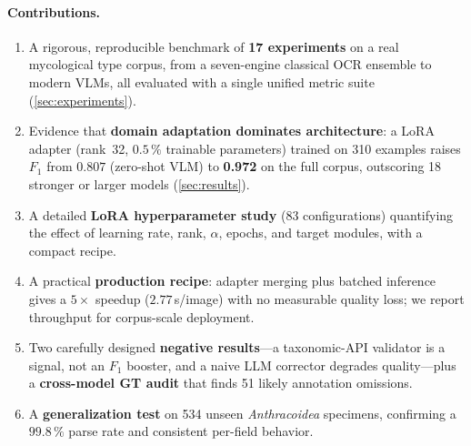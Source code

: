 \paragraph{Contributions.}
\begin{enumerate}[itemsep=1pt,topsep=2pt,leftmargin=1.4em]
\item A rigorous, reproducible benchmark of \textbf{17 experiments} on a real
mycological type corpus, from a seven-engine classical OCR ensemble to modern
VLMs, all evaluated with a single unified metric suite
(\cref{sec:experiments}).
\item Evidence that \textbf{domain adaptation dominates architecture}: a LoRA
adapter (rank~32, $0.5\,\%$ trainable parameters) trained on 310 examples
raises $F_1$ from $0.807$ (zero-shot VLM) to \textbf{0.972} on the full corpus,
outscoring 18 stronger or larger models (\cref{sec:results}).
\item A detailed \textbf{LoRA hyperparameter study} (83 configurations)
quantifying the effect of learning rate, rank, $\alpha$, epochs, and target
modules, with a compact recipe.
\item A practical \textbf{production recipe}: adapter merging plus batched
inference gives a $5\times$ speedup ($2.77$\,s/image) with no measurable quality
loss; we report throughput for corpus-scale deployment.
\item Two carefully designed \textbf{negative results}---a taxonomic-API
validator is a signal, not an $F_1$ booster, and a naive LLM corrector degrades
quality---plus a \textbf{cross-model GT audit} that finds 51 likely annotation
omissions.
\item A \textbf{generalization test} on 534 unseen \emph{Anthracoidea}
specimens, confirming a $99.8\,\%$ parse rate and consistent per-field behavior.
\end{enumerate}
